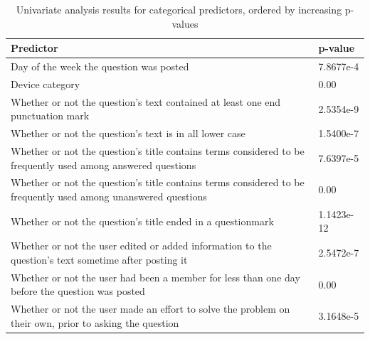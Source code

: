 \documentclass{article}
\begin{document}
\begin{table}[!htbp]
\centering
\caption{Univariate analysis results for categorical predictors, ordered by increasing p-values} 
\begin{tabular}{|p{12cm}|p{2cm}|}
  \hline
 Predictor & p-value \\ 
  \hline \hline
  Day of the week the question was posted & 7.8677e-4 \\ \hline
  Device category & 0.00 \\ \hline
  Whether or not the question's text contained at least one end punctuation mark & 2.5354e-9 \\ \hline
  Whether or not the question's text is in all lower case & 1.5400e-7 \\ \hline
  Whether or not the question's title contains terms considered to be frequently used among answered questions & 7.6397e-5 \\ \hline
  Whether or not the question's title contains terms considered to be frequently used among unanswered questions & 0.00 \\ \hline
  Whether or not the question's title ended in a questionmark & 1.1423e-12 \\ \hline
  Whether or not the user edited or added information to the question's text sometime after posting it & 2.5472e-7 \\ \hline
  Whether or not the user had been a member for less than one day before the question was posted & 0.00 \\ \hline
  Whether or not the user made an effort to solve the problem on their own, prior to asking the question & 3.1648e-5 \\ \hline
  
\end{tabular}
\label{table:cresults}
\end{table}
\end{document}

